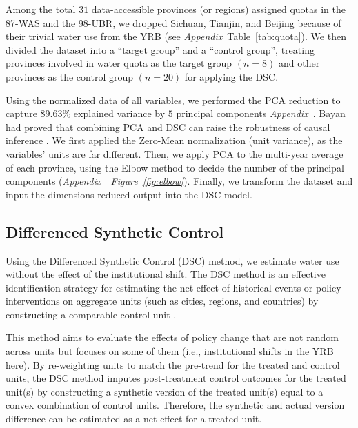 \documentclass[default, sn-standardnature]{sn-jnl} %
\begin{document}
Among the total $31$ data-accessible provinces (or regions) assigned quotas in the 87-WAS and the 98-UBR, we dropped Sichuan, Tianjin, and Beijing because of their trivial water use from the YRB (see \textit{Appendix}~Table~\ref{tab:quota}). We then divided the dataset into a ``target group'' and a ``control group'', treating provinces involved in water quota as the target group $(n=8)$ and other provinces as the control group $(n=20)$ for applying the DSC.

Using the normalized data of all variables, we performed the PCA reduction to capture $89.63\%$ explained variance by $5$ principal components \textit{Appendix~}. Bayan had proved that combining PCA and DSC can raise the robustness of causal inference \cite{bayani2021}. We first applied the Zero-Mean normalization (unit variance), as the variables' units are far different. Then, we apply PCA to the multi-year average of each province, using the Elbow method to decide the number of the principal components (\textit{Appendix~~Figure~\ref{fig:elbow}}). Finally, we transform the dataset and input the dimensions-reduced output into the DSC model.


\subsection{Differenced Synthetic Control}\label{sec:DSC}
Using the Differenced Synthetic Control (DSC) method, we estimate water use without the effect of the institutional shift.
The DSC method is an effective identification strategy for estimating the net effect of historical events or policy interventions on aggregate units (such as cities, regions, and countries) by constructing a comparable control unit \cite{abadie2010, abadie2015, hill2021}.

This method aims to evaluate the effects of policy change that are not random across units but focuses on some of them (i.e., institutional shifts in the YRB here).
By re-weighting units to match the pre-trend for the treated and control units, the DSC method imputes post-treatment control outcomes for the treated unit(s) by constructing a synthetic version of the treated unit(s) equal to a convex combination of control units.
Therefore, the synthetic and actual version difference can be estimated as a net effect for a treated unit.
\end{document}
